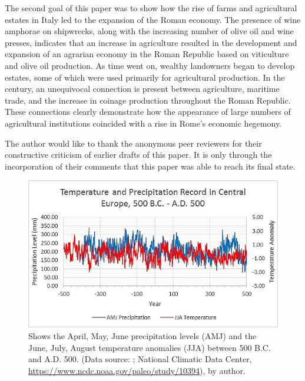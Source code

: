 The second goal of this paper was to show how the rise of farms and agricultural estates in Italy led to the expansion of the Roman economy. The presence of wine amphorae on shipwrecks, along with the increasing number of olive oil and wine presses, indicates that an increase in agriculture resulted in the development and expansion of an agrarian economy in the Roman Republic based on viticulture and olive oil production. As time went on, wealthy landowners began to develop estates, some of which were used primarily for agricultural production. In the  century\BC, an unequivocal connection is present between agriculture, maritime trade, and the increase in coinage production throughout the Roman Republic. These connections clearly demonstrate how the appearance of large numbers of agricultural institutions coincided with a rise in Rome’s economic hegemony.

\myseparator

The author would like to thank the anonymous peer reviewers for their constructive criticism of earlier drafts of this paper. It is only through the incorporation of their comments that this paper was able to reach its final state.
\\[1em]
	
	\begin{figure}[!h]
		\includegraphics[width=\linewidth]{figures/Davis_Agroeconomy_Fig1.jpg}
		\centering
		\caption{Shows the April, May, June precipitation levels (AMJ) and the June, July, August temperature anomalies (JJA) between 500 B.C. and A.D. 500. (Data source: \textcite{Büntgen_2011b}; National Climatic Data Center, \url{https://www.ncdc.noaa.gov/paleo/study/10394}), by author.}
		\label{fig:DavisFig1}
	\end{figure}	
	
